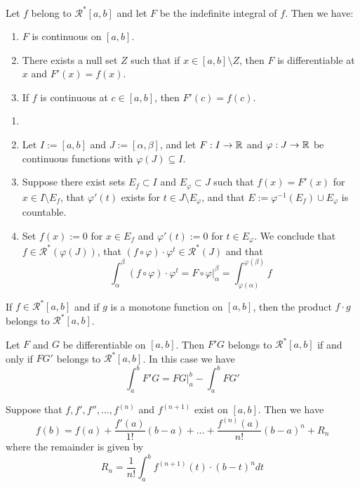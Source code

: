 \begin{theorem}
	Let $f$ belong to $\mathcal{R}^*[a,b]$ and let $F$ be the indefinite integral of $f$. Then we have:
	\begin{enumerate}
		\item $F$ is continuous on $[a,b]$.
		\item There exists a null set $Z$ such that if $x \in [a,b]\setminus Z$, then $F$ is differentiable at $x$ and $F'(x)=f(x)$.
		\item If $f$ is continuous at $c \in [a,b]$, then $F'(c)=f(c)$.
	\end{enumerate}
\end{theorem}

\begin{theorem}
	\begin{enumerate}
		\item[]
		\item Let $I:=[a,b]$ and $J:=[\alpha, \beta]$, and let $F:I \to \mathbb{R}$ and $\varphi:J \to \mathbb{R}$ be continuous functions with $\varphi(J)\subseteq I$.
		\item Suppose there exist sets $E_f \subset I$ and $E_\varphi\subset J$ such that $f(x)=F'(x)$ for $x \in I\setminus E_f$, that $\varphi'(t)$ exists for $t \in J\setminus E_\varphi$, and that $E:=\varphi^{-1}(E_f)\cup E_\varphi$ is countable.
		\item Set $f(x):=0$ for $x \in E_f$ and $\varphi'(t):=0$ for $t \in E_\varphi$. We conclude that $f \in \mathcal{R}^*(\varphi(J))$, that $(f \circ \varphi)\cdot \varphi^t \in \mathcal{R}^*(J)$ and that
		      \[\displaystyle\int_{\alpha}^{\beta}(f \circ \varphi)\cdot\varphi^t=F\circ\varphi\left.\right|_\alpha^\beta=\displaystyle\int_{\varphi(\alpha)}^{\varphi(\beta)}f\]
	\end{enumerate}
\end{theorem}

\begin{theorem}
	If $f \in \mathcal{R}^*[a,b]$ and if $g$ is a monotone function on $[a,b]$, then the product $f \cdot g$ belongs to $\mathcal{R}^*[a,b]$.
\end{theorem}

\begin{theorem}
	Let $F$ and $G$ be differentiable on $[a,b]$. Then $F'G$ belongs to $\mathcal{R}^*[a,b]$ if and only if $FG'$ belongs to $\mathcal{R}^*[a,b]$. In this case we have
	\[\displaystyle\int_{a}^{b}F'G=FG\left.\right|_a^b-\displaystyle\int_{a}^{b}FG'\]
\end{theorem}

\begin{theorem}
	Suppose that $f,f',f'',\dots,f^{(n)}$ and $f^{(n+1)}$ exist on $[a,b]$. Then we have
	\[f(b)=f(a)+\frac{f'(a)}{1!}(b-a)+\dots+\frac{f^{(n)}(a)}{n!}(b-a)^n+R_n\]
	where the remainder is given by
	\[R_n=\frac{1}{n!}\displaystyle\int_{a}^{b}f^{(n+1)}(t)\cdot(b-t)^n dt\]
\end{theorem}
